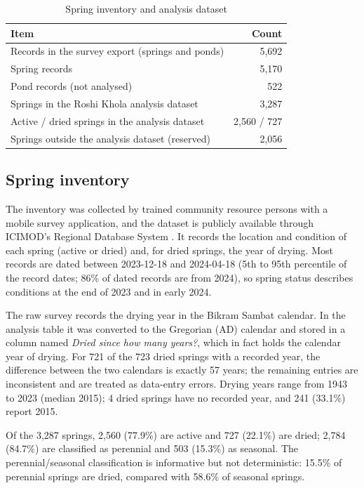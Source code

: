 \documentclass[12pt,a4paper]{article}
\begin{document}
\begin{table}[htbp]
\centering
\small
\caption{Spring inventory and analysis dataset}
\label{tab:inventory}
\begin{tabularx}{\linewidth}{LR}
\toprule
\textbf{Item} & \textbf{Count} \\
\midrule
Records in the survey export (springs and ponds) & 5,692 \\
Spring records & 5,170 \\
Pond records (not analysed) & 522 \\
Springs in the Roshi Khola analysis dataset & 3,287 \\
Active / dried springs in the analysis dataset & 2,560 / 727 \\
Springs outside the analysis dataset (reserved) & 2,056 \\
\bottomrule
\end{tabularx}
\end{table}

\subsection{Spring inventory}\label{sec:inventory}

The inventory was collected by trained community resource persons with a mobile survey application, and the dataset is publicly available through ICIMOD's Regional Database System \citep{thapa2025}. It records the location and condition of each spring (active or dried) and, for dried springs, the year of drying. Most records are dated between 2023-12-18 and 2024-04-18 (5th to 95th percentile of the record dates; 86\% of dated records are from 2024), so spring status describes conditions at the end of 2023 and in early 2024.

The raw survey records the drying year in the Bikram Sambat calendar. In the analysis table it was converted to the Gregorian (AD) calendar and stored in a column named \emph{Dried since how many years?}, which in fact holds the calendar year of drying. For 721 of the 723 dried springs with a recorded year, the difference between the two calendars is exactly 57 years; the remaining entries are inconsistent and are treated as data-entry errors. Drying years range from 1943 to 2023 (median 2015); 4 dried springs have no recorded year, and 241 (33.1\%) report 2015.

Of the 3,287 springs, 2,560 (77.9\%) are active and 727 (22.1\%) are dried; 2,784 (84.7\%) are classified as perennial and 503 (15.3\%) as seasonal. The perennial/seasonal classification is informative but not deterministic: 15.5\% of perennial springs are dried, compared with 58.6\% of seasonal springs.
\end{document}

